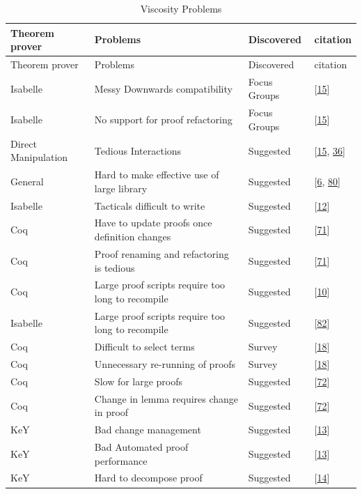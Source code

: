 \documentclass[
]{article}
\begin{document}
\hypertarget{tbl:viscosity}{}
\begin{longtable}[]{@{}llll@{}}
\caption{\label{tbl:viscosity}Viscosity Problems}\tabularnewline
\toprule
Theorem prover & Problems & Discovered & citation \\
\midrule
\endfirsthead
\toprule
Theorem prover & Problems & Discovered & citation \\
\midrule
\endhead
Isabelle & Messy Downwards compatibility & Focus Groups &
{[}\protect\hyperlink{ref-beckert_usability_2015}{15}{]} \\
Isabelle & No support for proof refactoring & Focus Groups &
{[}\protect\hyperlink{ref-beckert_usability_2015}{15}{]} \\
Direct Manipulation & Tedious Interactions & Suggested &
{[}\protect\hyperlink{ref-beckert_usability_2015}{15},
\protect\hyperlink{ref-grebing_usability_2020}{36}{]} \\
General & Hard to make effective use of large library & Suggested &
{[}\protect\hyperlink{ref-asperti_considerations_2010}{6},
\protect\hyperlink{ref-tassi_interactive_2008}{80}{]} \\
Isabelle & Tacticals difficult to write & Suggested &
{[}\protect\hyperlink{ref-becker_lassie_2021}{12}{]} \\
Coq & Have to update proofs once definition changes & Suggested &
{[}\protect\hyperlink{ref-ringer_replica_2020}{71}{]} \\
Coq & Proof renaming and refactoring is tedious & Suggested &
{[}\protect\hyperlink{ref-ringer_replica_2020}{71}{]} \\
Coq & Large proof scripts require too long to recompile & Suggested &
{[}\protect\hyperlink{ref-barras_asynchronous_2015}{10}{]} \\
Isabelle & Large proof scripts require too long to recompile & Suggested
& {[}\protect\hyperlink{ref-wenzel_asynchronous_2014}{82}{]} \\
Coq & Difficult to select terms & Survey &
{[}\protect\hyperlink{ref-berman_development_2014}{18}{]} \\
Coq & Unnecessary re-running of proofs & Survey &
{[}\protect\hyperlink{ref-berman_development_2014}{18}{]} \\
Coq & Slow for large proofs & Suggested &
{[}\protect\hyperlink{ref-roe_coqpie_2016}{72}{]} \\
Coq & Change in lemma requires change in proof & Suggested &
{[}\protect\hyperlink{ref-roe_coqpie_2016}{72}{]} \\
KeY & Bad change management & Suggested &
{[}\protect\hyperlink{ref-beckert_evaluating_2012}{13}{]} \\
KeY & Bad Automated proof performance & Suggested &
{[}\protect\hyperlink{ref-beckert_evaluating_2012}{13}{]} \\
KeY & Hard to decompose proof & Suggested &
{[}\protect\hyperlink{ref-beckert_interactive_2015}{14}{]} \\
\bottomrule
\end{longtable}
\end{document}
